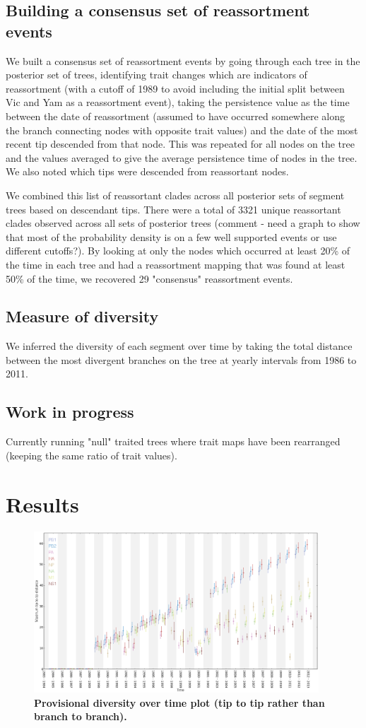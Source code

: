 \documentclass[11pt,oneside,letterpaper]{article}
\begin{document}
\subsection*{Building a consensus set of reassortment events}
We built a consensus set of reassortment events by going through each tree in the posterior set of trees, identifying trait changes which are indicators of reassortment (with a cutoff of 1989 to avoid including the initial split between Vic and Yam as a reassortment event), taking the persistence value as the time between the date of reassortment (assumed to have occurred somewhere along the branch connecting nodes with opposite trait values) and the date of the most recent tip descended from that node. 
This was repeated for all nodes on the tree and the values averaged to give the average persistence time of nodes in the tree. 
We also noted which tips were descended from reassortant nodes.

We combined this list of reassortant clades across all posterior sets of segment trees based on descendant tips. 
There were a total of 3321 unique reassortant clades observed across all sets of posterior trees (comment - need a graph to show that most of the probability density is on a few well supported events or use different cutoffs?). 
By looking at only the nodes which occurred at least 20\% of the time in each tree and had a reassortment mapping that was found at least 50\% of the time, we recovered 29 "consensus" reassortment events.

\subsection*{Measure of diversity}
We inferred the diversity of each segment over time by taking the total distance between the most divergent branches on the tree at yearly intervals from 1986 to 2011. 

\subsection*{Work in progress}
Currently running "null" traited trees where trait maps have been rearranged (keeping the same ratio of trait values).

\section*{Results}


\begin{figure}[h]
	\centering		
	\includegraphics[width=0.95\textwidth]{figures/InfB_diversityOverTime}
	\caption{\textbf{Provisional diversity over time plot (tip to tip rather than branch to branch).}}
\end{figure}




\end{document}
